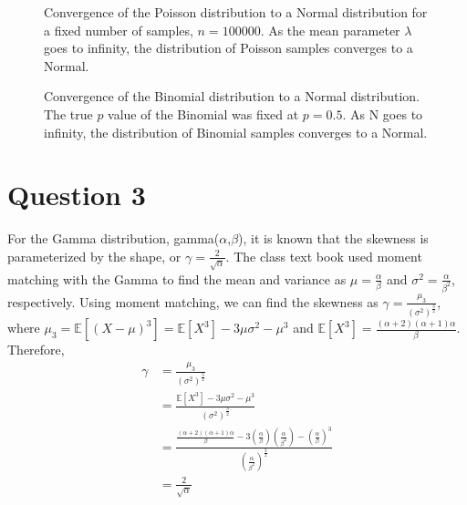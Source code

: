 \documentclass{article}[12 pt]
\begin{document}
\begin{figure}[H]%
	\centering
	\qquad
	\qquad
	\qquad
	\caption{Convergence of the Poisson distribution to a Normal distribution for a fixed number of samples, $n=100000$. As the mean parameter $\lambda$ goes to infinity, the distribution of Poisson samples converges to a Normal.}%
	\label{fig:q2_pois_to_normal}%
\end{figure}

\begin{figure}[H]%
	\centering
	\qquad
	\qquad
	\qquad
	\qquad
	\qquad
	\caption{Convergence of the Binomial distribution to a Normal distribution.  The true $p$ value of the Binomial was fixed at $p=0.5$.  As N goes to infinity, the distribution of Binomial samples converges to a Normal.}%
	\label{fig:q2_bin_to_normal}%
\end{figure}



\newpage
\section*{Question 3}

For the Gamma distribution, gamma($\alpha$,$\beta$), it is known that the skewness is parameterized by the shape, or $\gamma=\frac{2}{\sqrt{\alpha}}$.  The class text book used moment matching with the Gamma to find the mean and variance as $\mu=\frac{\alpha}{\beta}$ and $\sigma^2=\frac{\alpha}{\beta^2}$, respectively.  Using moment matching, we can find the skewness as $\gamma=\frac{\mu_3}{(\sigma^2)^{\frac{3}{2}}}$, where $\mu_3 = \mathbb{E}[(X-\mu)^3]=\mathbb{E}[X^3]-3\mu \sigma^2 - \mu^3$ and $ \mathbb{E}[X^3]=\frac{(\alpha+2)(\alpha+1)\alpha}{\beta}$.  Therefore, 
\begin{align*}
	\gamma &= \frac{\mu_3}{(\sigma^2)^{\frac{3}{2}}} \\
	&= \frac{\mathbb{E}[X^3]-3\mu \sigma^2 - \mu^3}{(\sigma^2)^{\frac{3}{2}}} \\
	&= \frac{\frac{(\alpha+2)(\alpha+1)\alpha}{\beta} - 3(\frac{\alpha}{\beta})(\frac{\alpha}{\beta^2}) - (\frac{\alpha}{\beta})^3}{(\frac{\alpha}{\beta^2})^{\frac{3}{2}}} \\
	&= \frac{2}{\sqrt{\alpha}}
\end{align*}
\end{document}
